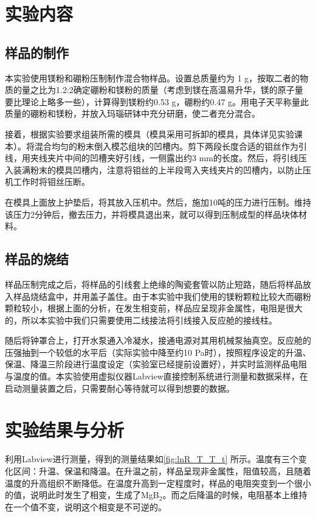 \documentclass[font=default]{mpltx}
\begin{document}
\section{实验内容}
\subsection{样品的制作}
本实验使用镁粉和硼粉压制制作混合物样品。设置总质量约为 1 g，按取二者的物质的量之比为1.2:2确定硼粉和镁粉的质量（考虑到镁在高温易升华，镁的原子量要比理论上略多一些），计算得到镁粉约0.53 g，硼粉约0.47 g。用电子天平称量此质量的硼粉和镁粉，并放入玛瑙研钵中充分研磨，使二者充分混合。

接着，根据实验要求组装所需的模具（模具采用可拆卸的模具，具体详见实验课本\cite{book}）。将混合均匀的粉末倒入模芯组块的凹槽内。剪下两段长度合适的钼丝作为引线，用夹线夹片中间的凹槽夹好引线，一侧露出约3 mm的长度。然后，将引线压入装满粉末的模具凹槽内，注意将钼丝的上半段弯入夹线夹片的凹槽内，以防止压机工作时将钼丝压断。

在模具上面放上护垫后，将其放入压机中。然后，施加10吨的压力进行压制。维持该压力2分钟后，撤去压力，并将模具退出来，就可以得到压制成型的样品块体材料。
\subsection{样品的烧结}
样品压制完成之后，将样品的引线套上绝缘的陶瓷套管以防止短路，随后将样品放入样品烧结盒中，并用盖子盖住。由于本实验中我们使用的镁粉颗粒比较大而硼粉颗粒较小，根据上面的分析，在发生相变前，样品应呈现非金属性，电阻是很大的，所以本实验中我们只需要使用二线接法将引线接入反应舱的接线柱。

随后将钟罩合上，打开水泵通入冷凝水，接通电源对其用机械泵抽真空。反应舱的压强抽到一个较低的水平后（实际实验中降至约10 Pa时），按照程序设定的升温、保温、降温三阶段进行温度设定（实验室已经提前设置好），并实时监测样品电阻与温度的值。本实验使用虚拟仪器Labview直接控制系统进行测量和数据采样，在启动测量装置之后，只需要耐心等待就可以得到想要的数据。

\section{实验结果与分析}
利用Labview进行测量，得到的测量结果如\autoref{fig:lnR_T_T_t} 所示。温度有三个变化区间：升温、保温和降温。在升温之前，样品呈现非金属性，阻值较高，且随着温度的升高组织不断降低。在温度升高到一定程度时，样品的电阻突变到一个很小的值，说明此时发生了相变，生成了MgB$_2$。而之后降温的时候，电阻基本上维持在一个值不变，说明这个相变是不可逆的。
\end{document}
